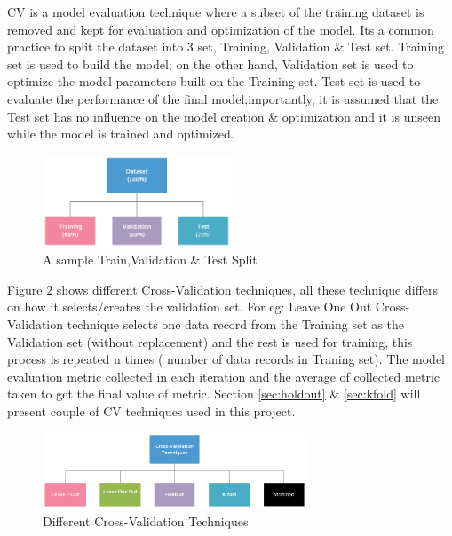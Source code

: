 \documentclass[twoside,11pt,a4paper]{article}
\begin{document}
\acf{CV} is a model evaluation technique where a subset of the training dataset is removed and kept for evaluation and optimization of the model. Its a common practice to split the dataset into 3 set, Training, Validation \& Test set. Training set is used to build the model; on the other hand, Validation set is used to optimize the model parameters built on the Training set. Test set is used to evaluate the performance of the final model;importantly, it is assumed that the Test set has no influence on the model creation \& optimization and it is unseen while the model is trained and optimized.\\
\begin{figure}[ht]
	\centering
	\includegraphics[width=0.5\textwidth]{dataset_split}
	\caption[A sample Train,Validation \& Test Split]{A sample Train,Validation \& Test Split}
	\label{fig:dataset_split}
\end{figure}
\FloatBarrier
Figure \ref{fig:cv_techniques} shows different Cross-Validation techniques, all these technique differs on how it selects/creates the validation set. For eg: Leave One Out Cross-Validation technique selects one data record from the Training set as the Validation set (without replacement) and the rest is used for training, this process is repeated n times ( number of data records in Traning set). The model evaluation metric collected in each iteration and the average of collected metric taken to get the final value of metric. Section \ref{sec:holdout} \& \ref{sec:kfold} will present couple of \acs{CV} techniques used in this project.\\
\begin{figure}[ht]
	\centering
	\includegraphics[width=0.7\textwidth]{cv_techniques}
	\caption[Different Cross-Validation Techniques]{Different Cross-Validation Techniques}
	\label{fig:cv_techniques}
\end{figure}
\FloatBarrier
\end{document}
